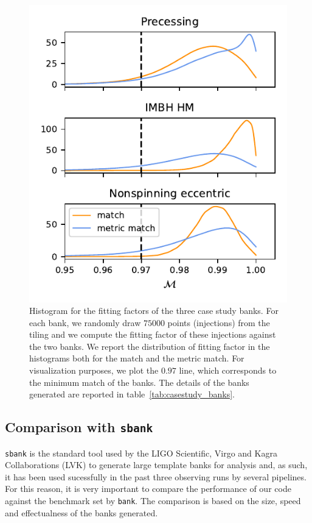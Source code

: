 \documentclass[twocolumn,showpacs,preprintnumbers,nofootinbib,prd,
superscriptaddress,10pt]{revtex4-2}
\newcommand{\stefano}[1]{{\textcolor{blue}{\texttt{SS: #1}} }}
\begin{document}
\begin{figure}[t!]
	\includegraphics{bank_injections}
	\caption{
	Histogram for the fitting factors of the three case study banks. For each bank, we randomly draw $75000$ points (injections) from the tiling and we compute the fitting factor of these injections against the two banks. We report the distribution of fitting factor in the histograms both for the match and the metric match. For visualization purposes, we plot the $0.97$ line, which corresponds to the minimum match of the banks.
	The details of the banks generated are reported in table~\ref{tab:casestudy_banks}.
	}
	\label{fig:bank_injections}
\end{figure}

\subsection{Comparison with \texttt{sbank} }\label{sec:sbank_comparison}

\texttt{sbank} \cite{sbank} is the standard tool used by the LIGO Scientific, Virgo and Kagra Collaborations (LVK) to generate large template banks for analysis and, as such, it has been used sucessfully in the past three observing runs by several pipelines.
For this reason, it is very important to compare the performance of our code against the benchmark set by \texttt{bank}. The comparison is based on the size, speed and effectualness of the banks generated.
\end{document}
